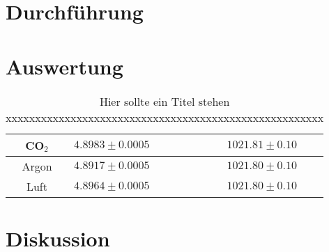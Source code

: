 \documentclass[12pt,a4paper,titlepage,headinclude,bibtotoc]{scrartcl}
\begin{document}
\section{Durchführung}
\label{sec:durchfuehrung}

\section{Auswertung}
\label{sec:auswertung}

\begin{table}[!htbp]
\centering
\begin{tabular}{|c|l|c|}
\hline
CO$_2$	& $4.8983 \pm 0.0005$ & $1021.81 \pm 0.10$ \\\hline
Argon	& $4.8917 \pm 0.0005$ & $1021.80 \pm 0.10$ \\\hline
Luft	& $4.8964 \pm 0.0005$ & $1021.80 \pm 0.10$ \\\hline
\end{tabular}
\caption{Hier sollte ein Titel stehen xxxxxxxxxxxxxxxxxxxxxxxxxxxxxxxxxxxxxxxxxxxxxxxxxxxxxx} \label{tab:position}
\end{table}
\section{Diskussion}
\label{sec:diskussion}





\end{document}
